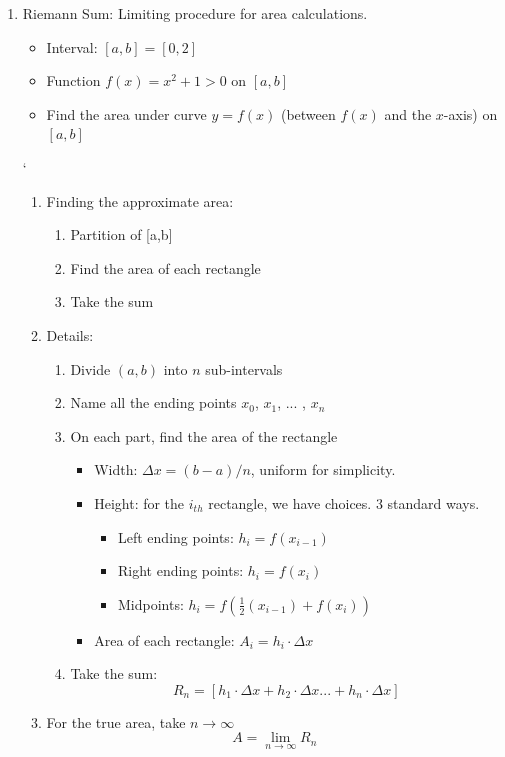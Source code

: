 \documentclass{article}
\begin{document}
\begin{enumerate}
\item Riemann Sum: Limiting procedure for area calculations. 
\begin{itemize}
\item Interval: $[a,b]=[0,2]$
\item Function $f(x)=x^2+1>0$ on $[a,b]$
\item Find the area under curve $y=f(x)$ (between $f(x)$ and the $x$-axis) on $[a,b]$
\end{itemize}
`
\begin{enumerate}
\item Finding the approximate area:
\begin{enumerate}
\item Partition of [a,b]
\item Find the area of each rectangle
\item Take the sum
\end{enumerate}

\item Details:
\begin{enumerate}
\item Divide $(a,b)$ into $n$ sub-intervals
\item Name all the ending points $x_0$, $x_1$,  ... , $x_n$
\item On each part, find the area of the rectangle
\begin{itemize}
\item Width: $\Delta x = (b-a)/n$, uniform for simplicity.
\item Height: for the $i_{th}$ rectangle, we have choices. 3 standard ways.
\begin{itemize}
\item Left ending points: $h_i = f(x_{i-1})$
\item Right ending points: $h_i = f(x_i)$
\item Midpoints: $h_i = f\left(\frac{1}{2}(x_{i-1})+f(x_{i})\right)$
\end{itemize}
\item Area of each rectangle: $A_i=h_i\cdot \Delta x$
\end{itemize}
\item Take the sum: 
$$
R_n = [h_1\cdot \Delta x+h_2\cdot \Delta x...+h_n\cdot \Delta x]
$$
\end{enumerate}
\item For the true area, take $n\rightarrow \infty$
$$
A = \lim_{n\rightarrow \infty} R_n
$$ 
\end{enumerate}


\end{enumerate}
\end{document}

